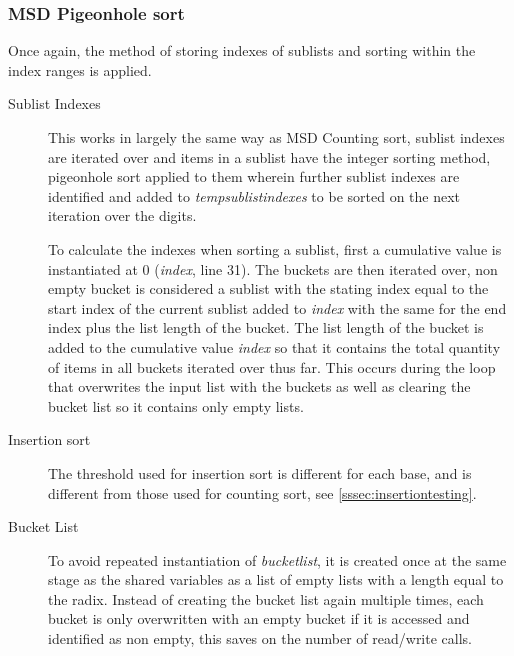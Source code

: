 \documentclass[12pt]{article}
\begin{document}
\pagebreak
\subsubsection{MSD Pigeonhole sort}
Once again, the method of storing indexes of sublists and sorting within the index ranges is applied.
\begin{description}
	\item[Sublist Indexes] This works in largely the same way as MSD Counting sort, sublist indexes are iterated over and items in a sublist have the integer sorting method, pigeonhole sort applied to them wherein further sublist indexes are identified and added to \textit{temp\textunderscore sublist\textunderscore indexes} to be sorted on the next iteration over the digits.
	\par To calculate the indexes when sorting a sublist, first a cumulative value is instantiated at 0 (\textit{index}, line 31). The buckets are then iterated over, non empty bucket is considered a sublist with the stating index equal to the start index of the current sublist added to \textit{index} with the same for the end index plus the list length of the bucket. The list length of the bucket is added to the cumulative value \textit{index} so that it contains the total quantity of items in all buckets iterated over thus far. This occurs during the loop that overwrites the input list with the buckets as well as clearing the bucket list so it contains only empty lists.
	\item[Insertion sort] The threshold used for insertion sort is different for each base, and is different from those used for counting sort, see \ref{sssec:insertiontesting}.
	\item[Bucket List] To avoid repeated instantiation of \textit{bucket\textunderscore list}, it is created once at the same stage as the shared variables as a list of empty lists with a length equal to the radix. Instead of creating the bucket list again multiple times, each bucket is only overwritten with an empty bucket if it is accessed and identified as non empty, this saves on the number of read/write calls.
\end{description}
\end{document}

